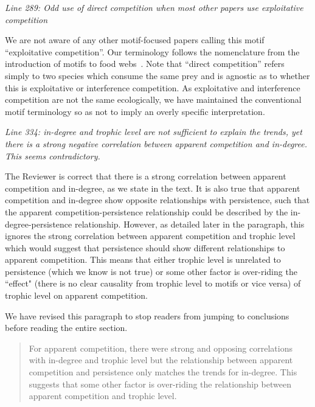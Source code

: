 \documentclass[12pt]{article}
\newcommand{\us}{\rm \setlength{\leftskip}{0.3cm} \setlength{\rightskip}{0.3cm}}
\newcommand{\them}{\it \setlength{\leftskip}{0cm} \setlength{\rightskip}{0cm}}
\begin{document}
        \them
        Line 289: Odd use of direct competition when most other papers use exploitative competition
        
        \us We are not aware of any other motif-focused papers calling this motif ``exploitative competition''. Our terminology follows the nomenclature from the introduction of motifs to food webs~\citep{Stouffer2007}.
        Note that ``direct competition'' refers simply to two species which consume the same prey and is agnostic as to whether this is exploitative or interference competition. 
        As exploitative and interference competition are not the same ecologically, we have maintained the conventional motif terminology so as not to imply an overly specific interpretation.
        
        
        \them
        Line 334: in-degree and trophic level are not sufficient to explain the trends, yet there is a strong negative correlation between apparent competition and in-degree. This seems contradictory.
        
        \us The Reviewer is correct that there is a strong  correlation between apparent competition and in-degree, as we state in the text. It is also true that apparent competition and in-degree show opposite relationships with persistence, such that the apparent competition-persistence relationship could be described by the in-degree-persistence relationship. However, as detailed later in the paragraph, this ignores the strong correlation between apparent competition and trophic level which would suggest that persistence should show different relationships to apparent competition. This means that either trophic level is unrelated to persistence (which we know is not true) or some other factor is over-riding the ``effect" (there is no clear causality from trophic level to motifs or vice versa) of trophic level on apparent competition.
        
        
        We have revised this paragraph to stop readers from jumping to conclusions before reading the entire section.
        
        \begin{quotation}
            For apparent competition, there were strong and opposing correlations with in-degree and trophic level but the relationship between apparent competition and persistence only matches the trends for in-degree.
            This suggests that some other factor is over-riding the relationship between apparent competition and trophic level.        
        \end{quotation}
        
\end{document}
